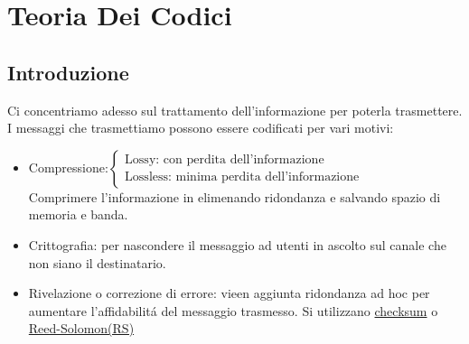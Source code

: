 \section{Teoria Dei Codici}
    \subsection{Introduzione}
        Ci concentriamo adesso sul trattamento dell'informazione per poterla trasmettere.
        I messaggi che trasmettiamo possono essere codificati per vari motivi:
        \begin{itemize}
            \item {
                    Compressione:$\begin{cases}
                        \text{Lossy: con perdita dell'informazione} \nonumber\\
                        \text{Lossless: minima perdita dell'informazione} \nonumber
                    \end{cases}$\\
                    Comprimere l'informazione in elimenando ridondanza e salvando spazio di memoria e banda.
                    
                }
            \item {
                    Crittografia: per nascondere il messaggio ad utenti in ascolto sul canale che non siano il destinatario.
            }
            \item {
                    Rivelazione o correzione di errore: vieen aggiunta ridondanza ad hoc per aumentare l'affidabilitá del messaggio trasmesso. 
                    Si utilizzano \href{https://en.wikipedia.org/wiki/Checksum}{checksum} o \href{https://en.wikipedia.org/wiki/Reed-Solomon_error_correction}{Reed-Solomon(RS)}
            }
        \end{itemize}

